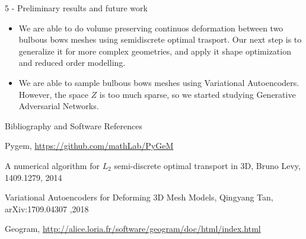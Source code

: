 \documentclass[b0paper,portrait]{baposter}
\begin{document}
\begin{poster}
\begin{posterbox}[name=results,below=vae,span=6,column=0]{5
    - Preliminary results and future work}

\begin{itemize}
 \setlength\itemsep{0.1em}
\item We are able to do volume preserving continuos deformation between two bulbous bows meshes using semidiscrete optimal trasport. Our next step is to generalize it for more complex geometries, and apply it shape optimization and reduced order modelling.
\item We are able to sample bulbous bows meshes using Variational Autoencoders. However, the space $Z$ is too much sparse, so we started studying Generative Adversarial Networks. 
\end{itemize}
\end{posterbox}
\begin{posterbox}[name=bibliography,below=results,span=6,column=0]{Bibliography and Software References}
\begingroup
\renewcommand{\section}[2]{}%
\begin{thebibliography}{9}
 \setlength\itemsep{0.1em}
Pygem, \url{https://github.com/mathLab/PyGeM}

A numerical algorithm for $L_{2}$ semi-discrete optimal transport in 3D, Bruno Levy, 1409.1279, 2014

Variational Autoencoders for Deforming 3D Mesh Models, Qingyang Tan, arXiv:1709.04307 ,2018

Geogram, \url{http://alice.loria.fr/software/geogram/doc/html/index.html}
\end{thebibliography}
\endgroup
\end{posterbox}

\end{poster}
\end{document}
